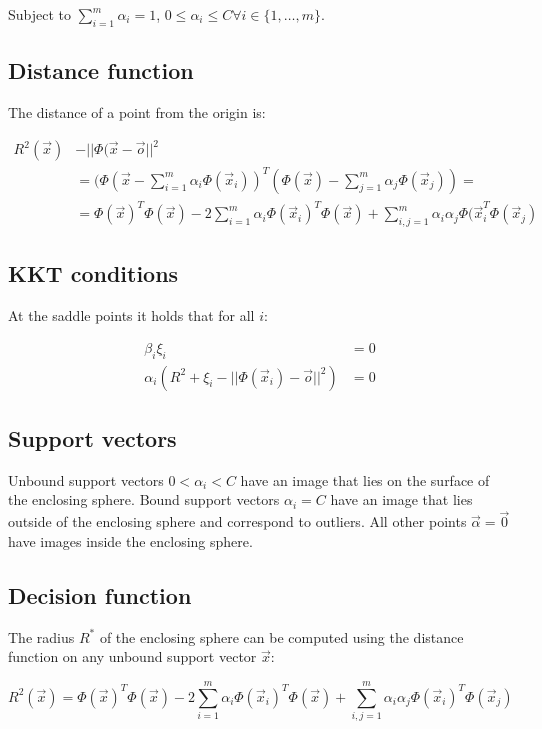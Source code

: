 	Subject to $\sum\limits_{i=1}^m\alpha_i=1$, $0\le\alpha_i\le C\forall i\in\{1, \dots, m\}$.

	\subsection{Distance function}
	The distance of a point from the origin is:

	\begin{align*}
		R^2(\vec{x}) &-||\Phi(\vec{x}-\vec{o}||^2\\
								 &=(\Phi(\vec{x}-\sum\limits_{i=1}^m\alpha_i\Phi(\vec{x}_i))^T(\Phi(\vec{x})-\sum\limits_{j=1}^m\alpha_j\Phi(\vec{x}_j))=\\
								 &=\Phi(\vec{x})^T\Phi(\vec{x}) - 2\sum\limits_{i=1}^m\alpha_i\Phi(\vec{x}_i)^T\Phi(\vec{x}) + \sum\limits_{i,j=1}^m\alpha_i\alpha_j\Phi(\vec{x}_i^T\Phi(\vec{x}_j)
	\end{align*}

	\subsection{KKT conditions}
	At the saddle points it holds that for all $i$:

	\begin{align*}
		\beta_i\xi_i &= 0\\
		\alpha_i(R^2+\xi_i-||\Phi(\vec{x}_i)-\vec{o}||^2) &=0
	\end{align*}

	\subsection{Support vectors}
	Unbound support vectors $0<\alpha_i<C$ have an image that lies on the surface of the enclosing sphere.
	Bound support vectors $\alpha_i = C$ have an image that lies outside of the enclosing sphere and correspond to outliers.
	All other points $\vec{\alpha} = \vec{0}$ have images inside the enclosing sphere.

	\subsection{Decision function}
	The radius $R^*$ of the enclosing sphere can be computed using the distance function on any unbound support vector $\vec{x}$:

	$$R^2(\vec{x}) = \Phi(\vec{x})^T\Phi(\vec{x})-2\sum\limits_{i=1}^m\alpha_i\Phi(\vec{x}_i)^T\Phi(\vec{x}) + \sum\limits_{i,j=1}^m\alpha_i\alpha_j\Phi(\vec{x}_i)^T\Phi(\vec{x}_j)$$

